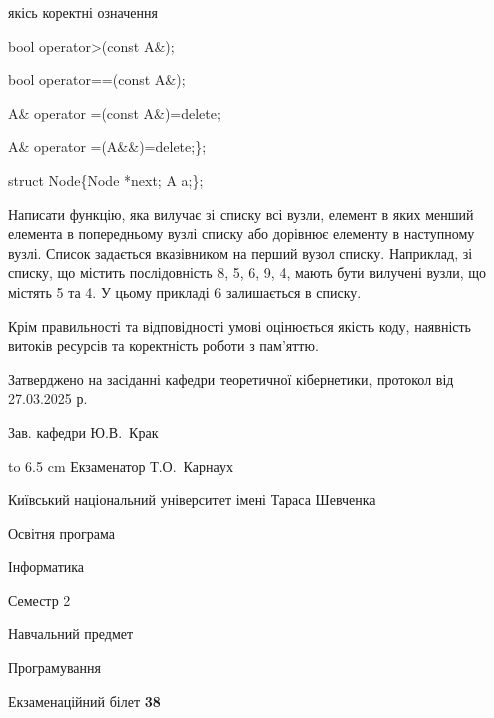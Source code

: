 \documentclass[12pt, ukrainian]{article}
\begin{document}
{\quad  якісь коректні означення 

\quad  bool operator>(const A\&); 

\quad  bool operator==(const A\&); 

\quad A\& operator =(const A\&)=delete; 

\quad  A\& operator =(A\&\&)=delete;\};

struct Node\{Node *next; A a;\};

 Написати функцію, яка вилучає зі списку всі вузли, елемент в яких менший елемента в попередньому вузлі списку або дорівнює елементу в наступному вузлі. Список задається вказівником на перший вузол списку. Наприклад, зі списку, що містить послідовність 8, 5, 6, 9, 4, мають бути вилучені вузли, що містять 5 та 4. У цьому прикладі 6 залишається в списку.

Крім правильності та відповідності умові оцінюється якість коду, наявність витоків ресурсів та коректність роботи з пам'яттю. 

}
{\smallskip\smallskip \begin {scriptsize} Затверджено на засіданні кафедри теоретичної кібернетики, протокол   від   27.03.2025 р.\par\smallskip\smallskip\smallskip\smallskip
{\parbox {6.5 cm} {Зав. кафедри \dotfill Ю.В.~Крак}}\hspace {0.7cm} {\hbox to 6.5 cm { Екзаменатор \dotfill Т.О.~Карнаух}} \end{scriptsize}}
\newpage
{{\begin {scriptsize}\par
{ \center  Київський національний університет імені Тараса Шевченка \par}
{\parbox {5 cm}{Освітня програма \hfill}{\parbox {7 cm}{Інформатика\hfill}}\parbox {6 cm}{\hfill Семестр 2}}\par
{\parbox {5 cm} {Навчальний предмет \hfill}\parbox {7 cm}{Програмування \hfill}\parbox {6cm}{\hfill}\par}\vspace{-15pt} \end{scriptsize}}{\center Екзаменаційний білет \No \textbf { 38 }\par}}
\end{document}
